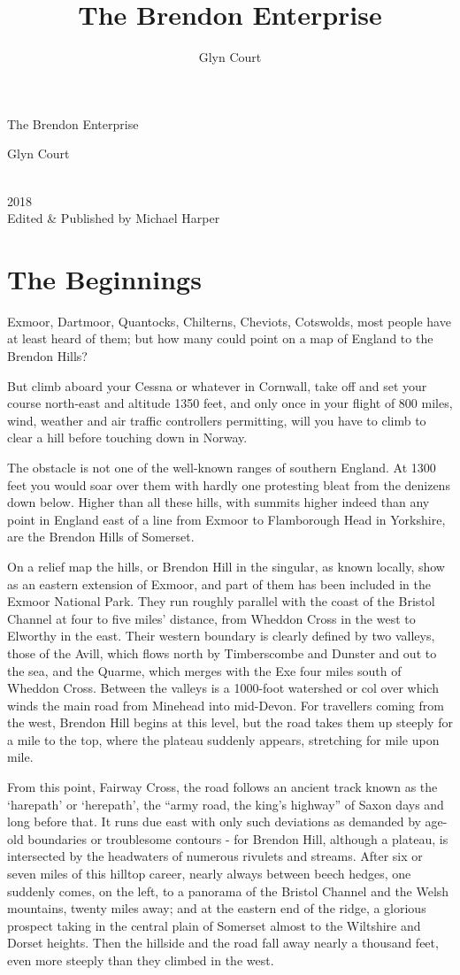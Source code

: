 \documentclass[11pt]{book}
\title{The Brendon Enterprise}
\author{Glyn Court}
\date{}
\newcommand*{\plogo}{\fbox{\textbf{MH}}} %
\newcommand*{\titleBC}{\begingroup %
\centering %
\huge{The Brendon Enterprise} %

\vfill %
\Large{Glyn Court} %

\vfill %
\normalsize
\plogo\\[0.5\baselineskip]
2018 \\%
\centering
Edited \& Published by Michael Harper \\

\endgroup}
\begin{document}
\frontmatter

\thispagestyle{empty}  %
\titleBC 

\tableofcontents

\mainmatter	



\chapter{The Beginnings}

Exmoor, Dartmoor, Quantocks, Chilterns, Cheviots, Cotswolds, most people have at least heard of them; but how many could point on a map of England to the Brendon Hills?

But climb aboard your Cessna or whatever in Cornwall, take off and set your course north-east and altitude 1350 feet, and only once in your flight of 800 miles, wind, weather and air traffic controllers permitting, will you have to climb to clear a hill before touching down in Norway.

The obstacle is not one of the well-known ranges of southern England.  At 1300 feet you would soar over them with hardly one protesting bleat from the denizens down below. Higher than all these  hills, with summits higher indeed than any point in England east of a line from Exmoor to Flamborough Head in Yorkshire, are the Brendon Hills of Somerset.

On a relief map the hills, or Brendon Hill in the singular, as known locally, show as an eastern extension of Exmoor, and part of them has been included in the Exmoor National Park.   They run roughly parallel with the coast of the Bristol Channel at four to five miles' distance, from Wheddon Cross in the west to Elworthy in the east. Their western boundary is clearly defined  by two valleys,  those of the Avill, which flows north by Timberscombe and Dunster and out to the sea,  and the Quarme, which merges with the Exe four miles south of Wheddon Cross.  Between the valleys is a 1000-foot watershed or col over which winds the main road from Minehead into mid-Devon. For travellers coming from the west, Brendon Hill begins at this level, but the road takes them up steeply for a mile to the top, where the plateau suddenly appears, stretching for mile upon mile.

From this point, Fairway Cross, the road follows an ancient track known as the ‘harepath’ or ‘herepath’, the “army road, the king’s highway” of Saxon days and long before that. It runs due east with only such deviations as demanded  by age-old boundaries or troublesome contours - for Brendon Hill, although a plateau, is intersected by the headwaters of numerous rivulets and streams. After six or seven miles of this hilltop career, nearly always between beech hedges, one suddenly comes, on the left,  to a panorama of the Bristol Channel and the Welsh mountains, twenty miles away; and at the eastern end of the ridge, a glorious prospect taking in the central plain of Somerset almost to the Wiltshire and Dorset heights. Then the hillside and the road fall away nearly a thousand feet, even more steeply than they climbed in the west.
\end{document}
